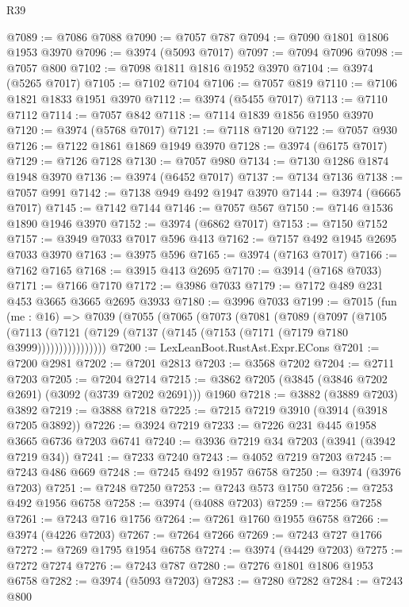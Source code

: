 \begin{lexlean}{R39}
\begin{coremodule}
@7089 := @7086 @7088
@7090 := @7057 @787
@7094 := @7090 @1801 @1806 @1953 @3970
@7096 := @3974 (@5093 @7017)
@7097 := @7094 @7096
@7098 := @7057 @800
@7102 := @7098 @1811 @1816 @1952 @3970
@7104 := @3974 (@5265 @7017)
@7105 := @7102 @7104
@7106 := @7057 @819
@7110 := @7106 @1821 @1833 @1951 @3970
@7112 := @3974 (@5455 @7017)
@7113 := @7110 @7112
@7114 := @7057 @842
@7118 := @7114 @1839 @1856 @1950 @3970
@7120 := @3974 (@5768 @7017)
@7121 := @7118 @7120
@7122 := @7057 @930
@7126 := @7122 @1861 @1869 @1949 @3970
@7128 := @3974 (@6175 @7017)
@7129 := @7126 @7128
@7130 := @7057 @980
@7134 := @7130 @1286 @1874 @1948 @3970
@7136 := @3974 (@6452 @7017)
@7137 := @7134 @7136
@7138 := @7057 @991
@7142 := @7138 @949 @492 @1947 @3970
@7144 := @3974 (@6665 @7017)
@7145 := @7142 @7144
@7146 := @7057 @567
@7150 := @7146 @1536 @1890 @1946 @3970
@7152 := @3974 (@6862 @7017)
@7153 := @7150 @7152
@7157 := @3949 @7033 @7017 @596 @413
@7162 := @7157 @492 @1945 @2695 @7033 @3970
@7163 := @3975 @596
@7165 := @3974 (@7163 @7017)
@7166 := @7162 @7165
@7168 := @3915 @413 @2695
@7170 := @3914 (@7168 @7033)
@7171 := @7166 @7170
@7172 := @3986 @7033
@7179 := @7172 @489 @231 @453 @3665 @3665 @2695 @3933
@7180 := @3996 @7033
@7199 := @7015
    (fun (me : @16) =>
    @7039
      (@7055
        (@7065
          (@7073
            (@7081
              (@7089
                (@7097
                  (@7105
                    (@7113
                      (@7121 (@7129 (@7137 (@7145 (@7153 (@7171 (@7179 @7180 @3999))))))))))))))))
@7200 := LexLeanBoot.RustAst.Expr.ECons
@7201 := @7200 @2981
@7202 := @7201 @2813
@7203 := @3568 @7202
@7204 := @2711 @7203
@7205 := @7204 @2714
@7215 := @3862 @7205 (@3845 (@3846 @7202 @2691) (@3092 (@3739 @7202 @2691))) @1960
@7218 := @3882 (@3889 @7203) @3892
@7219 := @3888 @7218
@7225 := @7215 @7219 @3910 (@3914 (@3918 @7205 @3892))
@7226 := @3924 @7219
@7233 := @7226 @231 @445 @1958 @3665 @6736 @7203 @6741
@7240 := @3936 @7219 @34 @7203 (@3941 (@3942 @7219 @34))
@7241 := @7233 @7240
@7243 := @4052 @7219 @7203
@7245 := @7243 @486 @669
@7248 := @7245 @492 @1957 @6758
@7250 := @3974 (@3976 @7203)
@7251 := @7248 @7250
@7253 := @7243 @573 @1750
@7256 := @7253 @492 @1956 @6758
@7258 := @3974 (@4088 @7203)
@7259 := @7256 @7258
@7261 := @7243 @716 @1756
@7264 := @7261 @1760 @1955 @6758
@7266 := @3974 (@4226 @7203)
@7267 := @7264 @7266
@7269 := @7243 @727 @1766
@7272 := @7269 @1795 @1954 @6758
@7274 := @3974 (@4429 @7203)
@7275 := @7272 @7274
@7276 := @7243 @787
@7280 := @7276 @1801 @1806 @1953 @6758
@7282 := @3974 (@5093 @7203)
@7283 := @7280 @7282
@7284 := @7243 @800

\end{coremodule}
\end{lexlean}
